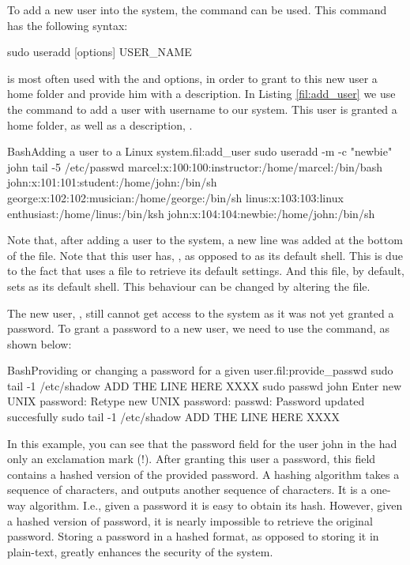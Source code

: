 To add a new user into the system, the  command can be used. This command has the following syntax:
\begin{command_line}
sudo useradd [options] USER_NAME
\end{command_line}
 is most often used with the  and  options, in order to grant to this new user a home folder and provide him with a description. In Listing \ref{fil:add_user} we use the  command to add a user with username  to our system. This user is granted a home folder,  as well as a description, .

\begin{command_line_float}{Bash}{Adding a user to a Linux system.}{fil:add_user}
sudo useradd -m -c "newbie" john
tail -5 /etc/passwd
marcel:x:100:100:instructor:/home/marcel:/bin/bash 
john:x:101:101:student:/home/john:/bin/sh
george:x:102:102:musician:/home/george:/bin/sh
linus:x:103:103:linux enthusiast:/home/linus:/bin/ksh
john:x:104:104:newbie:/home/john:/bin/sh
\end{command_line_float}

Note that, after adding a user to the system, a new line was added at the bottom of the  file. Note that this user has, , as opposed to  as its default shell. This is due to the fact that  uses a file  to retrieve its default settings. And this file, by default, sets  as its default shell. This behaviour can be changed by altering the  file.

The new user, , still cannot get access to the system as it was not yet granted a password. To grant a password to a new user, we need to use the  command, as shown below:
 
 \begin{command_line_float}{Bash}{Providing or changing a password for a given user.}{fil:provide_passwd}
sudo tail -1 /etc/shadow
ADD THE LINE HERE XXXX
sudo passwd john
Enter new UNIX password:
Retype new UNIX password:
passwd: Password updated succesfully
sudo tail -1 /etc/shadow
ADD THE LINE HERE XXXX
\end{command_line_float}

 In this example, you can see that the password field for the user john in the  had only an exclamation mark (!). After granting this user a password, this field contains a hashed version of the provided password. A hashing algorithm takes a sequence of characters, and outputs another sequence of characters. It is a one-way algorithm. I.e., given a password it is easy to obtain its hash. However, given a hashed version of password, it is nearly impossible to retrieve the original password. Storing a password in a hashed format, as opposed to storing it in plain-text, greatly enhances the security of the system.

